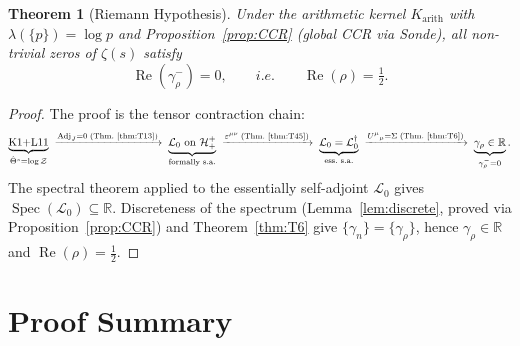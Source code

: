 \documentclass[12pt,a4paper]{article}
\newtheorem{theorem}{Theorem}[section]
\theoremstyle{remark}
\newcommand{\Adj}{\mathrm{Adj}}
\begin{document}
\begin{theorem}[Riemann Hypothesis]\label{thm:RH}
Under the arithmetic kernel $K_{\mathrm{arith}}$ with
$\lambda(\{p\})=\log p$ and Proposition~\ref{prop:CCR} (global CCR via Sonde),
all non-trivial zeros of $\zeta(s)$ satisfy
\[
\operatorname{Re}(\gamma_\rho^-) = 0,
\qquad\textit{i.e.}\qquad
\operatorname{Re}(\rho) = \tfrac{1}{2}.
\]
\end{theorem}
\begin{proof}
The proof is the tensor contraction chain:
\[
\underbrace{\text{K1+L11}}_{\hat\Theta^s=\log\mathcal{Z}}
\;\xrightarrow{\Adj_J=0\;\text{(Thm.~\ref{thm:T13})}}\;
\underbrace{\mathcal{L}_0\text{ on }\mathcal{H}^+_+}_{\text{formally s.a.}}
\;\xrightarrow{\varepsilon^{\mu\nu}\;\text{(Thm.~\ref{thm:T45})}}\;
\underbrace{\mathcal{L}_0=\mathcal{L}_0^\dagger}_{\text{ess.\ s.a.}}
\;\xrightarrow{U^\mu{}_\mu=\Sigma\;\text{(Thm.~\ref{thm:T6})}}\;
\underbrace{\gamma_\rho\in\mathbb{R}}_{\gamma_\rho^-=0}.
\]
The spectral theorem applied to the essentially self-adjoint $\mathcal{L}_0$
gives $\operatorname{Spec}(\mathcal{L}_0)\subseteq\mathbb{R}$.
Discreteness of the spectrum (Lemma~\ref{lem:discrete},
proved via Proposition~\ref{prop:CCR}) and Theorem~\ref{thm:T6}
give $\{\gamma_n\}=\{\gamma_\rho\}$,
hence $\gamma_\rho\in\mathbb{R}$ and $\operatorname{Re}(\rho)=\tfrac{1}{2}$.
\end{proof}

\section*{Proof Summary}
\end{document}

